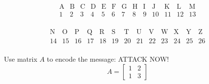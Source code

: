 \[
    \begin{array}{ccccccccccccc}
        \text{A} & \text{B} & \text{C} & \text{D} & \text{E} & \text{F} & \text{G} & \text{H} & \text{I} & \text{J} & \text{K} & \text{L} & \text{M} \\
        \hline
        1        & 2        & 3        & 4        & 5        & 6        & 7        & 8        & 9        & 10       & 11       & 12       & 13       \\
    \end{array}
\]

\[
    \begin{array}{ccccccccccccc}
        \text{N} & \text{O} & \text{P} & \text{Q} & \text{R} & \text{S} & \text{T} & \text{U} & \text{V} & \text{W} & \text{X} & \text{Y} & \text{Z} \\
        \hline
        14       & 15       & 16       & 17       & 18       & 19       & 20       & 21       & 22       & 23       & 24       & 25       & 26       \\
    \end{array}
\]


\begin{example}
    Use matrix \( A \) to encode the message: ATTACK NOW!
    \[ A = \begin{bmatrix} 1 & 2 \\ 1 & 3 \end{bmatrix} \]
\end{example}

